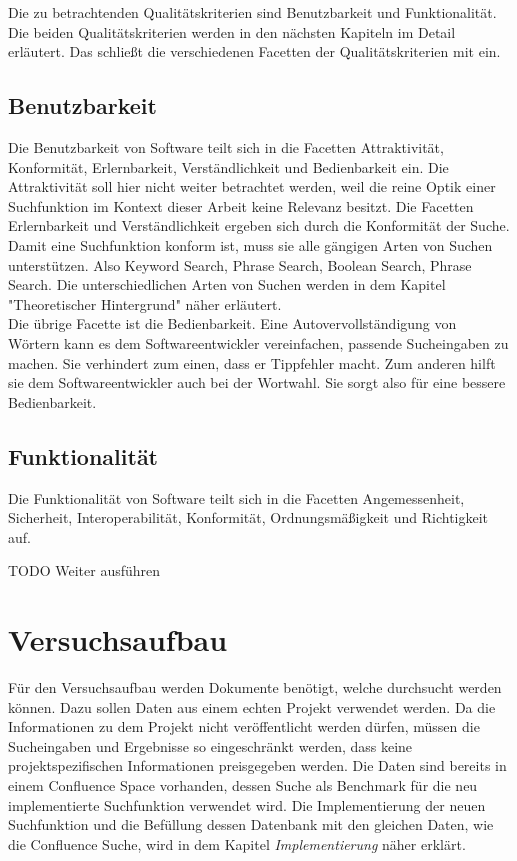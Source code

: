 Die zu betrachtenden Qualitätskriterien sind Benutzbarkeit und Funktionalität.
Die beiden Qualitätskriterien werden in den nächsten Kapiteln im Detail erläutert.
Das schließt die verschiedenen Facetten der Qualitätskriterien mit ein.

\subsection{Benutzbarkeit}
Die Benutzbarkeit von Software teilt sich in die Facetten Attraktivität, Konformität, Erlernbarkeit, Verständlichkeit und Bedienbarkeit ein.
Die Attraktivität soll hier nicht weiter betrachtet werden, weil die reine Optik einer Suchfunktion im Kontext dieser Arbeit keine Relevanz besitzt.
Die Facetten Erlernbarkeit und Verständlichkeit ergeben sich durch die Konformität der Suche.
Damit eine Suchfunktion konform ist, muss sie alle gängigen Arten von Suchen unterstützen.
Also Keyword Search, Phrase Search, Boolean Search, Phrase Search.
Die unterschiedlichen Arten von Suchen werden in dem Kapitel "Theoretischer Hintergrund" näher erläutert.\\

Die übrige Facette ist die Bedienbarkeit.
Eine Autovervollständigung von Wörtern kann es dem Softwareentwickler vereinfachen, passende Sucheingaben zu machen.
Sie verhindert zum einen, dass er Tippfehler macht.
Zum anderen hilft sie dem Softwareentwickler auch bei der Wortwahl.
Sie sorgt also für eine bessere Bedienbarkeit.\\

\subsection{Funktionalität}
Die Funktionalität von Software teilt sich in die Facetten Angemessenheit, Sicherheit, Interoperabilität, Konformität, Ordnungsmäßigkeit und Richtigkeit auf.

TODO Weiter ausführen

\section{Versuchsaufbau}
Für den Versuchsaufbau werden Dokumente benötigt, welche durchsucht werden können.
Dazu sollen Daten aus einem echten Projekt verwendet werden.
Da die Informationen zu dem Projekt nicht veröffentlicht werden dürfen, müssen die Sucheingaben und Ergebnisse so eingeschränkt werden, dass keine projektspezifischen Informationen preisgegeben werden.
Die Daten sind bereits in einem Confluence Space vorhanden, dessen Suche als Benchmark für die neu implementierte Suchfunktion verwendet wird.
Die Implementierung der neuen Suchfunktion und die Befüllung dessen Datenbank mit den gleichen Daten, wie die Confluence Suche, wird in dem Kapitel \textit{Implementierung} näher erklärt.\\

